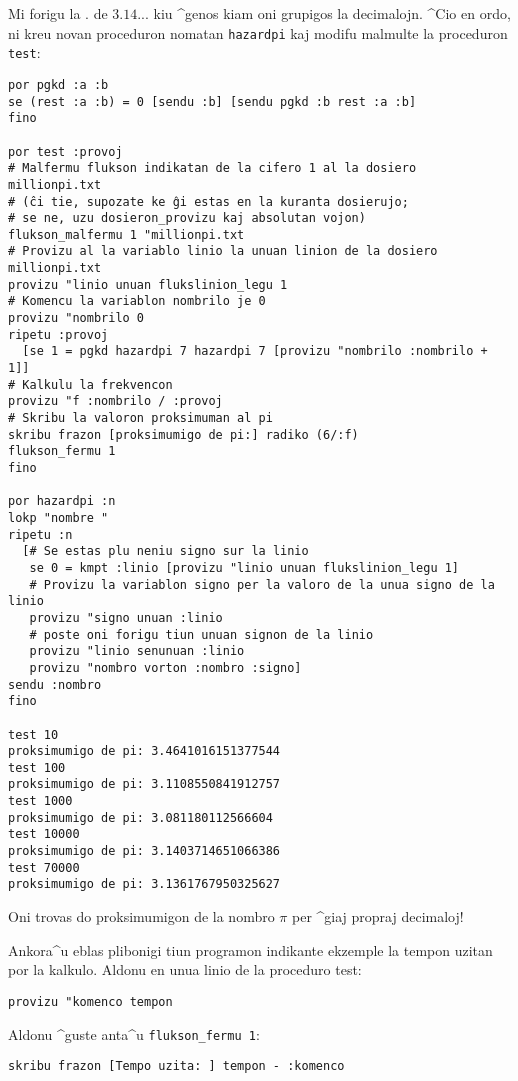 Mi forigu la \og $.$\fg{} de $3.14$... kiu ^genos kiam oni grupigos la
decimalojn.  ^Cio en ordo, ni kreu novan proceduron nomatan
\texttt{hazardpi} kaj modifu malmulte la proceduron \texttt{test}:
\begin{verbatim}
por pgkd :a :b
se (rest :a :b) = 0 [sendu :b] [sendu pgkd :b rest :a :b] 
fino

por test :provoj
# Malfermu flukson indikatan de la cifero 1 al la dosiero millionpi.txt
# (ĉi tie, supozate ke ĝi estas en la kuranta dosierujo;
# se ne, uzu dosieron_provizu kaj absolutan vojon)
flukson_malfermu 1 "millionpi.txt
# Provizu al la variablo linio la unuan linion de la dosiero millionpi.txt
provizu "linio unuan flukslinion_legu 1
# Komencu la variablon nombrilo je 0
provizu "nombrilo 0
ripetu :provoj 
  [se 1 = pgkd hazardpi 7 hazardpi 7 [provizu "nombrilo :nombrilo + 1]]
# Kalkulu la frekvencon
provizu "f :nombrilo / :provoj
# Skribu la valoron proksimuman al pi
skribu frazon [proksimumigo de pi:] radiko (6/:f)
flukson_fermu 1
fino

por hazardpi :n
lokp "nombre "
ripetu :n 
  [# Se estas plu neniu signo sur la linio
   se 0 = kmpt :linio [provizu "linio unuan flukslinion_legu 1]
   # Provizu la variablon signo per la valoro de la unua signo de la linio
   provizu "signo unuan :linio
   # poste oni forigu tiun unuan signon de la linio
   provizu "linio senunuan :linio
   provizu "nombro vorton :nombro :signo]
sendu :nombro
fino

test 10
proksimumigo de pi: 3.4641016151377544 
test 100
proksimumigo de pi: 3.1108550841912757 
test 1000
proksimumigo de pi: 3.081180112566604 
test 10000
proksimumigo de pi: 3.1403714651066386 
test 70000
proksimumigo de pi: 3.1361767950325627
\end{verbatim}

Oni trovas do proksimumigon de la nombro $\pi$ per ^giaj propraj
decimaloj!

Ankora^u eblas plibonigi tiun programon indikante ekzemple la tempon
uzitan por la kalkulo.  Aldonu en unua linio de la proceduro test:

\texttt{provizu "komenco tempon}

Aldonu ^guste anta^u \texttt{flukson\_fermu 1}:

\texttt{skribu frazon [Tempo uzita: ] tempon - :komenco}\\
